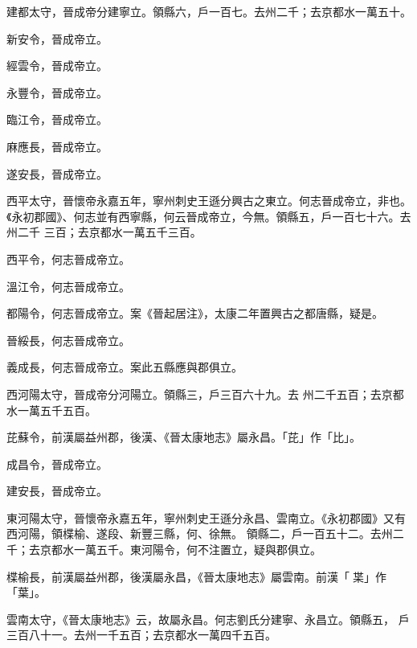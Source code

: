\begin{pinyinscope}
 建都太守，晉成帝分建寧立。領縣六，戶一百七。去州二千；去京都水一萬五十。



 新安令，晉成帝立。



 經雲令，晉成帝立。



 永豐令，晉成帝立。



 臨江令，晉成帝立。



 麻應長，晉成帝立。



 遂安長，晉成帝立。



 西平太守，晉懷帝永嘉五年，寧州刺史王遜分興古之東立。何志晉成帝立，非也。《永初郡國》、何志並有西寧縣，何云晉成帝立，今無。領縣五，戶一百七十六。去州二千
 三百；去京都水一萬五千三百。



 西平令，何志晉成帝立。



 溫江令，何志晉成帝立。



 都陽令，何志晉成帝立。案《晉起居注》，太康二年置興古之都唐縣，疑是。



 晉綏長，何志晉成帝立。



 義成長，何志晉成帝立。案此五縣應與郡俱立。



 西河陽太守，晉成帝分河陽立。領縣三，戶三百六十九。去
 州二千五百；去京都水一萬五千五百。



 芘蘇令，前漢屬益州郡，後漢、《晉太康地志》屬永昌。「芘」作「比」。



 成昌令，晉成帝立。



 建安長，晉成帝立。


東河陽太守，晉懷帝永嘉五年，寧州刺史王遜分永昌、雲南立。《永初郡國》又有西河陽，領楪榆、遂段、新豐三縣，何、徐無。
 領縣二，戶一百五十二。去州二
 千；去京都水一萬五千。東河陽令，何不注置立，疑與郡俱立。



 楪榆長，前漢屬益州郡，後漢屬永昌，《晉太康地志》屬雲南。前漢「枼」作「葉」。


雲南太守，《晉太康地志》云，故屬永昌。何志劉氏分建寧、永昌立。領縣五，
 戶三百八十一。去州一千五百；去京都水一萬四千五百。




\end{pinyinscope}
